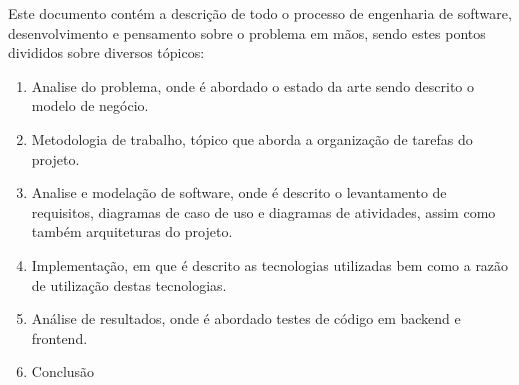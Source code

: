 Este documento contém a descrição de todo o processo de engenharia de software, desenvolvimento e 
pensamento sobre o problema em mãos, sendo estes pontos divididos sobre diversos tópicos:
\begin{enumerate}
    \item Analise do problema, onde é abordado o estado da arte sendo descrito o modelo de negócio.
    \item Metodologia de trabalho, tópico que aborda a organização de tarefas do projeto.
    \item Analise e modelação de software, onde é descrito o levantamento de requisitos, diagramas 
    de caso de uso e diagramas de atividades, assim como também arquiteturas do projeto.
    \item Implementação, em que é descrito as tecnologias utilizadas bem como a razão de utilização 
    destas tecnologias.
    \item Análise de resultados, onde é abordado testes de código em backend e frontend.
    \item Conclusão
\end{enumerate}


